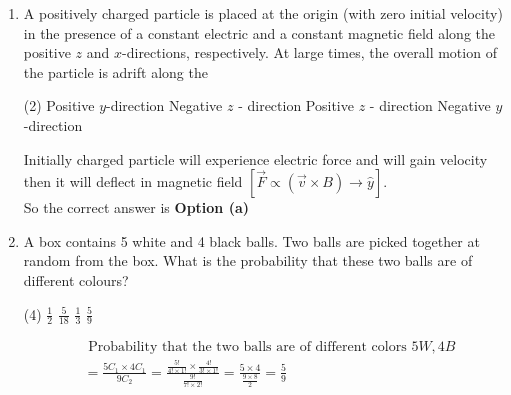 \begin{enumerate}
\begin{answer}
\begin{align*}
\begin{array}{ccc}
	\hat{x} & \hat{y} & \hat{z} \\
	\frac{\partial}{\partial x} & \frac{\partial}{\partial y} & \frac{\partial}{\partial z} \\
	a x y+z^{3} & x^{2} & b x z^{2}
	\end{array}\right|=0\\
	\Rightarrow \hat{x}(0-0)-\hat{y}\left(b z^{2}-3 z^{2}\right)+\hat{z}(2 x-a x)&=0 \\
	\Rightarrow b-3=0 \text { and } z-a=0 \text { or } a=2, b=3
	\end{align*}
		So the correct answer is \textbf{Option (a)}
\end{answer}
\item A positively charged particle is placed at the origin (with zero initial velocity) in the presence of a constant electric and a constant magnetic field along the positive $z$ and $x$-directions, respectively. At large times, the overall motion of the particle is adrift along the
 \begin{tasks}(2)
	\task[\textbf{a.}] Positive $y$-direction
	\task[\textbf{b.}] Negative $z$ - direction
	\task[\textbf{c.}]Positive $z$ - direction
	\task[\textbf{d.}]  Negative $y$-direction
\end{tasks}
\begin{answer}
 Initially charged particle will experience electric force and will gain velocity then it will deflect in magnetic field $[\vec{F} \propto(\vec{v} \times B) \rightarrow \hat{y}]$.\\
		So the correct answer is \textbf{Option (a)}
\end{answer}
\item A box contains 5 white and 4 black balls. Two balls are picked together at random from the box. What is the probability that these two balls are of different colours?
 \begin{tasks}(4)
	\task[\textbf{a.}] $\frac{1}{2}$
	\task[\textbf{b.}]$\frac{5}{18}$
	\task[\textbf{c.}]$\frac{1}{3}$
	\task[\textbf{d.}]  $\frac{5}{9}$
\end{tasks}
\begin{answer}
	\begin{align*}
	&\text { Probability that the two balls are of different colors }5 W, 4 B\\
	&=\frac{5 C_{1} \times 4 C_{1}}{9 C_{2}}=\frac{\frac{5 !}{4 ! \times 1 !} \times \frac{4 !}{3 ! \times 1 !}}{\frac{9 !}{7 ! \times 2 !}}=\frac{5 \times 4}{\frac{9 \times 8}{2}}=\frac{5}{9}
	\end{align*}

\end{answer}
\end{enumerate}
